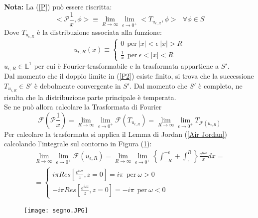 \documentclass[twoside]{article}
\begin{document}
\textbf{Nota:} La (\ref{P}) può essere riscritta:
\begin{equation}\label{P2}
    <\mathscr{P}\frac{1}{x},\phi>\equiv \lim_{R\to\infty}\lim_{\epsilon \to 0^+}<T_{u_{\epsilon,R}},\phi> \ \ \ \forall \phi \in S
\end{equation}
Dove $T_{u_{\epsilon,R}}$ è la distribuzione associata alla funzione:
\begin{equation}
    u_{\epsilon,R}(x)\equiv
    \left\{ \begin{array}{lr}
         0 \ \ \text{per} \ |x|<\epsilon \ |x|>R  \\
        \frac{1}{x} \ \ \text{per} \ \epsilon<|x|<R
    \end{array}
    \right.
\end{equation}
$u_{\epsilon,R} \in \mathds{L}^1$ per cui è Fourier-trasformabile e la trasformata appartiene a $S'$.
\\
Dal momento che il doppio limite in (\ref{P2}) esiste finito, si trova che la successione $T_{u_{\epsilon,R}} \in S'$ è debolmente convergente in $S'$. Dal momento che $S'$ è completo, ne risulta che la distribuzione parte principale è temperata.
\\
Se ne può allora calcolare la Trasformata di Fourier 
\begin{equation}
    \mathcal{F}\left(\mathscr{P}\frac{1}{x}\right)=\lim_{R\to\infty}\lim_{\epsilon \to 0^+}\mathcal{F}\left(T_{u_{\epsilon,R}}\right)=\lim_{R\to\infty}\lim_{\epsilon \to 0^+}T_{\mathcal{F}(u_{\epsilon,R})}
\end{equation}
Per calcolare la trasformata si applica il Lemma di Jordan (\ref{Air Jordan}) calcolando l'integrale sul contorno in Figura (\ref{segno}):
\begin{equation}\begin{split}
    \lim_{R\to\infty}\lim_{\epsilon \to 0^+}\mathcal{F}(u_{\epsilon,R})=\lim_{R\to\infty}\lim_{\epsilon \to 0^+}\left\{ \int_{-R}^{-\epsilon} + \int_{\epsilon}^R \right\}\frac{e^{i\omega x}}{x}dx = \\
    = \left\{ \begin{array}{lr}
         i\pi Res\left[\frac{e^{i\omega z}}{z},z=0 \right]=i\pi \ \ \text{per} \ \omega >0  \\
          -i\pi Res\left[\frac{e^{i\omega z}}{z},z=0 \right]=-i\pi \ \ \text{per} \ \omega <0
    \end{array} \right.
\end{split}\end{equation}
\begin{figure}[H]
\centering
\texttt{[image: segno.JPG]}
\label{segno}
\end{figure}
\end{document}
